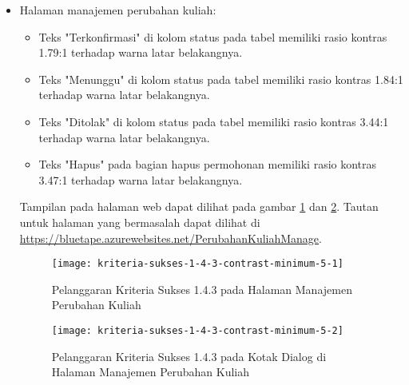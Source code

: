 \begin{itemize}
    \item Halaman manajemen perubahan kuliah: 
    \begin{itemize}
        \item Teks "Terkonfirmasi" di kolom status pada tabel memiliki rasio kontras 1.79:1 terhadap warna latar belakangnya.
        \item Teks "Menunggu" di kolom status pada tabel memiliki rasio kontras 1.84:1 terhadap warna latar belakangnya.
        \item Teks "Ditolak" di kolom status pada tabel memiliki rasio kontras 3.44:1 terhadap warna latar belakangnya.
        \item Teks "Hapus" pada bagian hapus permohonan memiliki rasio kontras 3.47:1 terhadap warna latar belakangnya.
    \end{itemize}
    Tampilan pada halaman web dapat dilihat pada gambar \ref{fig:1.4.3_contrast_minimum_5_1} dan \ref{fig:1.4.3_contrast_minimum_5_2}. Tautan untuk halaman yang bermasalah dapat dilihat di \url{https://bluetape.azurewebsites.net/PerubahanKuliahManage}.
    \begin{figure}[H]
        \centering  
        \texttt{[image: kriteria-sukses-1-4-3-contrast-minimum-5-1]}  
        \caption[Pelanggaran Kriteria Sukses 1.4.3 pada Halaman Manajemen Perubahan Kuliah]{Pelanggaran Kriteria Sukses 1.4.3 pada Halaman Manajemen Perubahan Kuliah}
        \label{fig:1.4.3_contrast_minimum_5_1}
    \end{figure} 
    
    \begin{figure}[H]
        \centering  
        \texttt{[image: kriteria-sukses-1-4-3-contrast-minimum-5-2]}  
        \caption[Pelanggaran Kriteria Sukses 1.4.3 pada Kotak Dialog di Halaman Manajemen Perubahan Kuliah]{Pelanggaran Kriteria Sukses 1.4.3 pada Kotak Dialog di Halaman Manajemen Perubahan Kuliah}
        \label{fig:1.4.3_contrast_minimum_5_2}
    \end{figure} 


\end{itemize}
